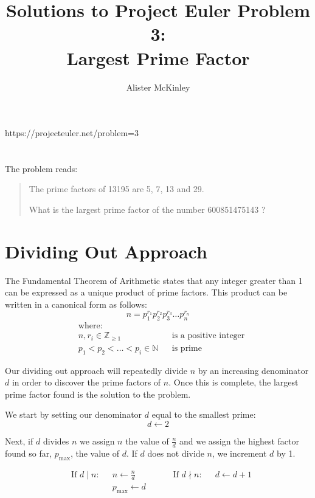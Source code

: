\documentclass{article}
\title{Solutions to Project Euler Problem 3:\\Largest Prime Factor}
\author{Alister McKinley}
\date{}
\begin{document}
\maketitle
\begin{center}
    https://projecteuler.net/problem=3
\end{center}

\section*{}
The problem reads:

\begin{quote}
    The prime factors of 13195 are 5, 7, 13 and 29.

    What is the largest prime factor of the number 600851475143 ?
\end{quote}

\section*{Dividing Out Approach}
The Fundamental Theorem of Arithmetic states that any integer greater than 1 can be expressed as a unique product of prime factors. This product can be written in a canonical form as follows:
\[ n = p_1^{r_1}p_2^{r_2}p_3^{r_3} \dots p_n^{r_n} \]
\[ \begin{aligned}
    & \text{where:} \\
    & n, r_i \in \mathbb{Z}_{\geq 1} && \text{is a positive integer} \\
    & p_1 < p_2 < \dots < p_i \in \mathbb{N} && \text{is prime}
\end{aligned} \]

Our dividing out approach will repeatedly divide \(n\) by an increasing denominator \(d\) in order to discover the prime factors of \(n\). Once this is complete, the largest prime factor found is the solution to the problem.

We start by setting our denominator \(d\) equal to the smallest prime:
\[d \leftarrow 2\]

Next, if \(d\) divides \(n\) we assign \(n\) the value of \(\frac{n}{d}\) and we assign the highest factor found so far, \(p_\text{max}\), the value of \(d\). If \(d\) does not divide \(n\), we increment \(d\) by 1.

\[\begin{aligned}
    & \text{If \(d \mid n\):} &&  n \leftarrow \frac{n}{d}  & && & \text{If \(d \nmid n\):} && d \leftarrow d + 1 \\
    & && p_\text{max} \leftarrow d
\end{aligned}\]
\end{document}
